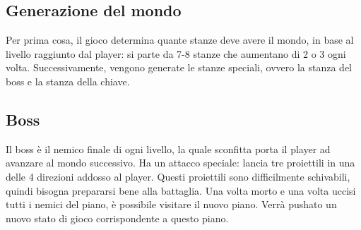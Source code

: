 \documentclass{article}
\begin{document}
\subsection{Generazione del mondo}
Per prima cosa, il gioco determina quante stanze deve avere il mondo, in base al livello raggiunto dal player: si parte da 7-8 stanze che aumentano di 2 o 3 ogni volta.
Successivamente, vengono generate le stanze speciali, ovvero la stanza del boss e la stanza della chiave.

\subsection{Boss}
Il boss è il nemico finale di ogni livello, la quale sconfitta porta il player ad avanzare al mondo successivo.
Ha un attacco speciale: lancia tre proiettili in una delle 4 direzioni addosso al player. Questi proiettili sono difficilmente schivabili, quindi bisogna prepararsi bene alla battaglia.
Una volta morto e una volta uccisi tutti i nemici del piano, è possibile visitare il nuovo piano.
Verrà pushato un nuovo stato di gioco corrispondente a questo piano.
\end{document}
